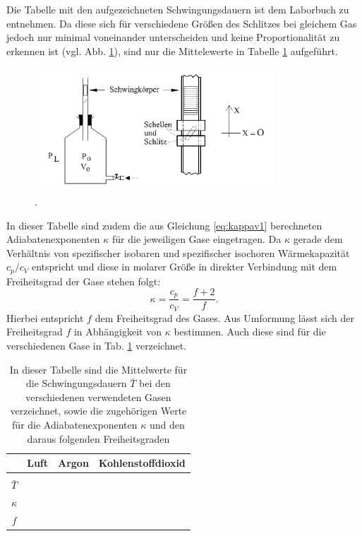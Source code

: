 		Die Tabelle mit den aufgezeichneten Schwingungsdauern ist dem Laborbuch zu entnehmen.
		Da diese sich für verschiedene Größen des Schlitzes bei gleichem Gas jedoch nur minimal voneinander unterscheiden und keine Proportionalität zu erkennen ist (vgl. Abb. \ref{fig:T/d}), sind nur die Mittelewerte in Tabelle \ref{tab:Werte1} aufgeführt.
		\begin{figure}[ht]
			\centering
			\includegraphics[width=0.8\textwidth]{bilder/aufbau_v1.png}
			\caption{.\cite{WWU}}
			\label{fig:T/d}	
		\end{figure}
		In dieser Tabelle sind zudem die aus Gleichung \ref{eq:kappav1} berechneten Adiabatenexponenten $\kappa$ für die jeweiligen Gase eingetragen.
		Da $\kappa$ gerade dem Verhältnis von spezifischer isobaren und spezifischer isochoren Wärmekapazität $c_p/c_V$ entspricht und diese in molarer Größe in direkter Verbindung mit dem Freiheitsgrad der Gase stehen folgt:
		\begin{equation} \label{eq:Freiheit}
		\kappa = \frac{c_p}{c_V} = \frac{f+2}{f}.
		\end{equation}
		Hierbei entspricht $f$ dem Freiheitsgrad des Gases.
		Aus Umformung lässt sich der Freiheitsgrad $f$ in Abhängigkeit von $\kappa$ bestimmen.
		Auch diese sind für die verschiedenen Gase in Tab. \ref{tab:Werte1} verzeichnet.
		\begin{table}
			\caption{In dieser Tabelle sind die Mittelwerte für die Schwingungsdauern $\bar{T}$ bei den verschiedenen verwendeten Gasen verzeichnet, sowie die zugehörigen Werte für die Adiabatenexponenten $\kappa$ und den daraus folgenden Freiheitsgraden}
			\label{tab:Werte1}
			\centering
			\begin{tabular}{c|c|c|c}					
				& Luft & Argon & Kohlenstoffdioxid\\
				\hline
				&&&\\ %
				$\bar{T}$ & & & \\ %
				$\kappa$ & & & \\ %
				$f$ & & & \\ %
			\end{tabular}
		\end{table} 
		
